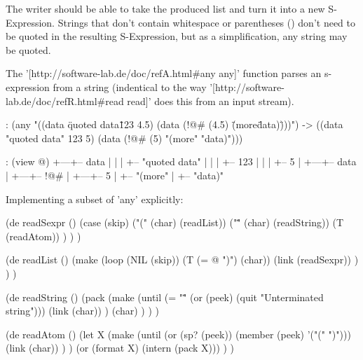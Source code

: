 The writer should be able to take the produced list and turn it into a
new S-Expression. Strings that don't contain whitespace or parentheses
() don't need to be quoted in the resulting S-Expression, but as a
simplification, any string may be quoted.



\begin{wideverbatim}

The '[http://software-lab.de/doc/refA.html#any any]' function parses an
s-expression from a string (indentical to the way
'[http://software-lab.de/doc/refR.html#read read]' does this from an input
stream).

: (any "((data \"quoted data\" 123 4.5) (data (!@# (4.5) \"(more\" \"data)\")))")
-> ((data "quoted data" 123 5) (data (!@# (5) "(more" "data)")))

: (view @)
+---+-- data
|   |
|   +-- "quoted data"
|   |
|   +-- 123
|   |
|   +-- 5
|
+---+-- data
    |
    +---+-- !@#
        |
        +---+-- 5
        |
        +-- "(more"
        |
        +-- "data)"

Implementing a subset of 'any' explicitly:

(de readSexpr ()
   (case (skip)
      ("(" (char) (readList))
      ("\"" (char) (readString))
      (T (readAtom)) ) ) )

(de readList ()
   (make
      (loop
         (NIL (skip))
         (T (= @ ")") (char))
         (link (readSexpr)) ) ) )

(de readString ()
   (pack
      (make
         (until (= "\"" (or (peek) (quit "Unterminated string")))
            (link (char)) )
         (char) ) ) )

(de readAtom ()
   (let X
      (make
         (until (or (sp? (peek)) (member (peek) '("(" ")")))
            (link (char)) ) )
      (or (format X) (intern (pack X))) ) )

\end{wideverbatim}

